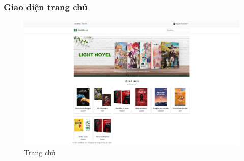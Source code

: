 \subsubsection{Giao diện trang chủ}
\begin{figure}[H]
  \centering
  \includegraphics[width=1\textwidth]{report/images/client/c_trangchu.png}
  \caption{Trang chủ}
\end{figure}